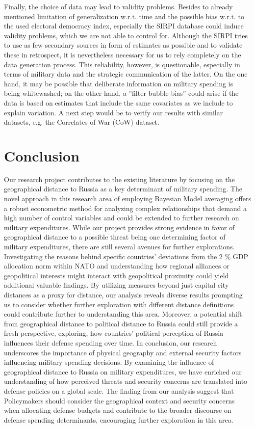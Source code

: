 \documentclass[12pt,a4paper]{article}
\begin{document}
Finally, the choice of data may lead to validity problems. Besides to already mentioned limitation of generalization w.r.t. time and the possible bias w.r.t. to the used electoral democracy index, especially the SIRPI database could induce validity problems, which we are not able to control for. Although the SIRPI tries to use as few secondary sources in form of estimates as possible and to validate these in retrospect, it is nevertheless necessary for us to rely completely on the data generation process. This reliability, however, is questionable, especially in terms of military data and the strategic communication of the latter. On the one hand, it may be possible that deliberate information on military spending is being whitewashed; on the other hand, a ''filter bubble bias'' could arise if the data is based on estimates that include the same covariates as we include to explain variation. A next step would be to verify our results with similar datasets, e.g. the Correlates of War (CoW) dataset.


\section{Conclusion}
Our research project contributes to the existing literature by focusing on the geographical distance to Russia as a key determinant of military spending. The novel approach in this research area of employing Bayesian Model averaging offers a robust econometric method for analyzing complex relationships that demand a high number of control variables and could be extended to further research on military expenditures. 
While our project provides strong evidence in favor of geographical distance to a possible threat being one determining factor of military expenditures, there are still several avenues for further explorations. Investigating the reasons behind specific countries’ deviations from the 2 \% GDP allocation norm within NATO and understanding how regional alliances or geopolitical interests might interact with geopolitical proximity could yield additional valuable findings. 
By utilizing measures beyond just capital city distances as a proxy for distance, our analysis reveals diverse results prompting us to consider whether further exploration with different distance definitions could contribute further to understanding this area. Moreover, a potential shift from geographical distance to political distance to Russia could still provide a fresh perspective, exploring, how countries’ political perception of Russia influences their defense spending over time.
In conclusion, our research underscores the importance of physical geography and external security factors influencing military spending decisions. By examining the influence of geographical distance to Russia on military expenditures, we have enriched our understanding of how perceived threats and security concerns are translated into defense policies on a global scale. The finding from our analysis suggest that Policymakers should consider the geographical context and security concerns when allocating defense budgets and contribute to the broader discourse on defense spending determinants, encouraging further exploration in this area.  
\end{document}
